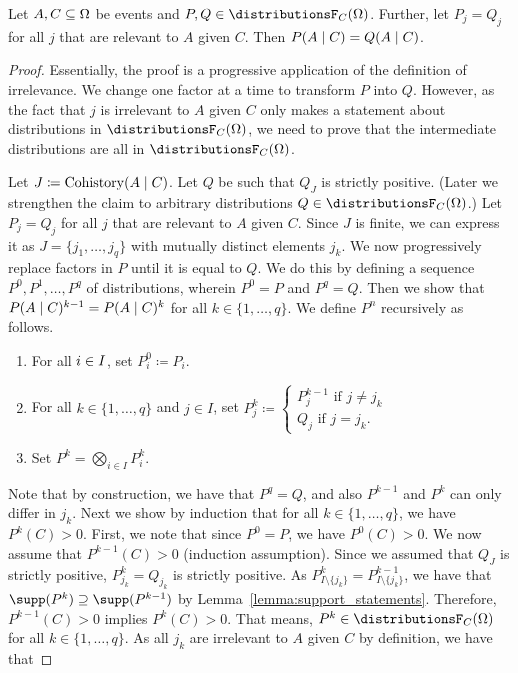 \documentclass[USenglish,onecolumn]{article}
\begin{document}
\begin{lemma}
  \label{lemma:progressive_application_irrelevance}
  Let $A, C \subseteq \Omega$ be events and $P, Q \in \distributionsF_{C}(\Omg)$.
  Further, let $P_j = Q_j$ for all $j$ that are relevant to $A$ given $C$. 
  Then $P(A \mid C) = Q(A \mid C)$.
\end{lemma}


\begin{proof}
  Essentially, the proof is a progressive application of the definition of irrelevance. We change one factor at a time to transform $P$ into $Q$.
  However, as the fact that $j$ is irrelevant to $A$ given $C$ only makes a statement about distributions in $\distributionsF_C(\Omg)$, we need to prove that the intermediate distributions are all in $\distributionsF_C(\Omg)$. 

  Let $J \coloneq \operatorname{Cohistory}(A \mid C)$.
  Let $Q$ be such that $Q_J$ is strictly positive. (Later we strengthen the claim to arbitrary distributions $Q\in\distributionsF_C(\Omg)$.)
  Let $P_j = Q_j$ for all $j$ that are relevant to $A$ given $C$.
  Since $J$ is finite, we can express it as $J = \{j_1, \dots, j_q\}$ with mutually distinct elements $j_k$.
  We now progressively replace factors in $P$ until it is equal to $Q$. We do this by defining a sequence $P^0, P^1, \dots , P^q$ of distributions, wherein $P^0=P$ and $P^q=Q$. Then we show that $P(A\mid C)^{k-1}=P(A\mid C)^k$ for all $k\in\{1, \dots, q\}$. We define $P^n$ recursively as follows.
  \begin{enumerate}
      \item For all ${i\in I}$, set $P^0_i\coloneq P_i$.
      \item For all $k \in \{1, \dots, q\}$ and $j \in I$, set $P^k_j \coloneq\begin{cases}P^{k-1}_j\text{ if $j \neq j_k$}\\  Q_j\text{ if $j = j_k$.}
      \end{cases}$
      \item Set $P^k = \bigotimes_{i \in I} P_i^k$.
  \end{enumerate}
Note that by construction, we have that $P^q = Q$, and also  $P^{k-1}$ and $P^{k}$ can only differ in $j_k$. Next we show by induction that for all $k\in \{1, \dots, q\}$, we have $P^k(C)>0$.
  First, we note that since $P^0 = P$, we have $P^0(C)>0$. We now assume that $P^{k-1}(C)>0$ (induction assumption).
  Since we assumed that $Q_J$ is strictly positive, $P^k_{j_k} = Q_{j_k}$ is strictly positive. As $P^{k}_{I \setminus \{j_k\}} = P^{k-1}_{I \setminus \{j_k\}}$, we have that $\supp(P^k) \supseteq \supp(P^{k-1})$ by Lemma~\ref{lemma:support_statements}. Therefore, $P^{k-1}(C) > 0$ implies $P^k(C) > 0$. That means, $P^k\in\distributionsF_C(\Omg)$ for all $k\in\{1,\dots,q\}$. As all $j_k$ are irrelevant to $A$ given $C$ by definition, we have that

\end{proof}
\end{document}

